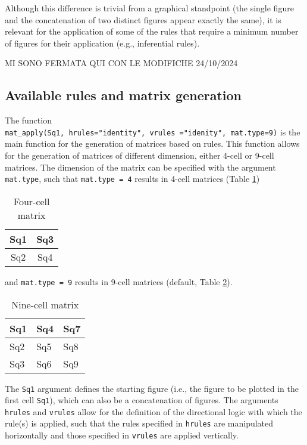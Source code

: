 Although this difference is trivial from a graphical standpoint (the single figure and the concatenation of two distinct figures appear exactly the same), it is relevant for the application of some of the rules that require a minimum number of figures for their application (e.g., inferential rules).

MI SONO FERMATA QUI CON LE MODIFICHE 24/10/2024

\subsection{Available rules and matrix generation}\label{available-rules-and-matrix-generation}

The function \texttt{mat\_apply(Sq1,\ hrules="identity",\ vrules\ ="idenity",\ mat.type=9)} is the main function for the generation of matrices based on rules.
This function allows for the generation of matrices of different dimension, either 4-cell or 9-cell matrices.
The dimension of the matrix can be specified with the argument \texttt{mat.type}, such that \texttt{mat.type\ =\ 4} results in 4-cell matrices (Table \ref{tab:fourCell-static})

\begin{table}

\caption{\label{tab:fourCell-static}Four-cell matrix}
\centering
\begin{tabular}[t]{c|c}
\hline
Sq1 & Sq3\\
\hline
Sq2 & Sq4\\
\hline
\end{tabular}
\end{table}

and \texttt{mat.type\ =\ 9} results in 9-cell matrices (default, Table \ref{tab:nineCell-static}).

\begin{table}

\caption{\label{tab:nineCell-static}Nine-cell matrix}
\centering
\begin{tabular}[t]{l|l|l}
\hline
Sq1 & Sq4 & Sq7\\
\hline
Sq2 & Sq5 & Sq8\\
\hline
Sq3 & Sq6 & Sq9\\
\hline
\end{tabular}
\end{table}

The \texttt{Sq1} argument defines the starting figure (i.e., the figure to be plotted in the first cell \texttt{Sq1}), which can also be a concatenation of figures.
The arguments \texttt{hrules} and \texttt{vrules} allow for the definition of the directional logic with which the rule(s) is applied, such that the rules specified in \texttt{hrules} are manipulated horizontally and those specified in \texttt{vrules} are applied vertically.


